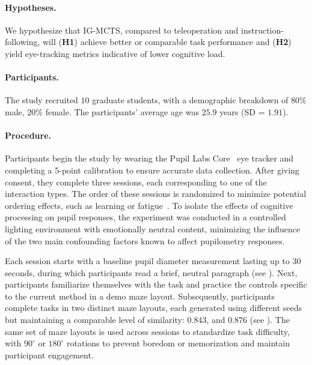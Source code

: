 \paragraph{Hypotheses.} We hypothesize that IG-MCTS, compared to teleoperation and instruction-following, will (\textbf{H1}) achieve better or comparable task performance and (\textbf{H2}) yield eye-tracking metrics indicative of lower cognitive load.


\paragraph{Participants.}
The study recruited $10$ graduate students, with a demographic breakdown of $80\%$ male, $20\%$ female. The participants' average age was $25.9$ years (SD = $1.91$). 

\paragraph{Procedure.}
Participants begin the study by wearing the Pupil Labs Core~\cite{kassner2014pupil} eye tracker and completing a 5-point calibration to ensure accurate data collection. After giving consent, they complete three sessions, each corresponding to one of the interaction types. The order of these sessions is randomized to minimize potential ordering effects, such as learning or fatigue~\cite{martin2007doing}.
To isolate the effects of cognitive processing on pupil responses, the experiment was conducted in a controlled lighting environment with emotionally neutral content, minimizing the influence of the two main confounding factors known to affect pupilometry responses.

Each session starts with a baseline pupil diameter measurement lasting up to 30 seconds, during which participants read a brief, neutral paragraph (see ).
Next, participants familiarize themselves with the task and practice the controls specific to the current method in a demo maze layout.
Subsequently, participants complete tasks in two distinct maze layouts, each generated using different seeds but maintaining a comparable level of similarity: $0.843$, and $0.876$ (see ). 
The same set of maze layouts is used across sessions to standardize task difficulty, with $90^\circ$ or $180^\circ$ rotations to prevent boredom or memorization and maintain participant engagement.

